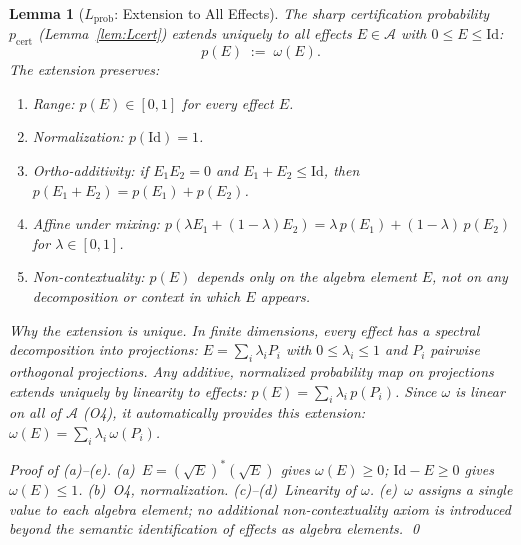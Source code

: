 \documentclass[11pt,a4paper]{article}
\newtheorem{lemma}[theorem]{Lemma}
\theoremstyle{definition}
\begin{document}
\begin{lemma}[$L_{\mathrm{prob}}$: Extension to All Effects]\label{lem:Lprob}
The sharp certification probability $p_{\mathrm{cert}}$ (Lemma~\ref{lem:Lcert}) extends uniquely to all effects $E \in \mathcal{A}$ with $0 \le E \le \mathrm{Id}$:
\[
p(E) \;:=\; \omega(E).
\]
The extension preserves:
\begin{enumerate}[nosep,label=(\alph*),leftmargin=2em]
\item \textit{Range:} $p(E) \in [0,1]$ for every effect $E$.
\item \textit{Normalization:} $p(\mathrm{Id}) = 1$.
\item \textit{Ortho-additivity:} if $E_1 E_2 = 0$ and $E_1 + E_2 \le \mathrm{Id}$, then $p(E_1 + E_2) = p(E_1) + p(E_2)$.
\item \textit{Affine under mixing:} $p(\lambda E_1 + (1-\lambda)E_2) = \lambda\,p(E_1) + (1-\lambda)\,p(E_2)$ for $\lambda \in [0,1]$.
\item \textit{Non-contextuality:} $p(E)$ depends only on the algebra element $E$, not on any decomposition or context in which $E$ appears.
\end{enumerate}

\smallskip\noindent\textit{Why the extension is unique.}  In finite dimensions, every effect has a spectral decomposition into projections: $E = \sum_i \lambda_i P_i$ with $0 \le \lambda_i \le 1$ and $P_i$ pairwise orthogonal projections.  Any additive, normalized probability map on projections extends uniquely by linearity to effects: $p(E) = \sum_i \lambda_i\, p(P_i)$.  Since $\omega$ is linear on all of $\mathcal{A}$ (O4), it automatically provides this extension: $\omega(E) = \sum_i \lambda_i\,\omega(P_i)$.

\smallskip\noindent\textit{Proof of (a)--(e).}  (a)~$E = (\sqrt{E})^*(\sqrt{E})$ gives $\omega(E) \ge 0$; $\mathrm{Id} - E \ge 0$ gives $\omega(E) \le 1$.  (b)~O4, normalization.  (c)--(d)~Linearity of $\omega$.  (e)~$\omega$ assigns a single value to each algebra element; no additional non-contextuality axiom is introduced beyond the semantic identification of effects as algebra elements.  \qed
\end{lemma}
\end{document}
